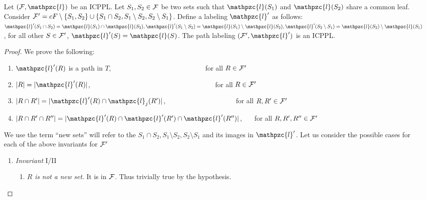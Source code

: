 \documentclass[envcountsect, envcountsame, 11pt]{../lib/llncs2e/llncs}
\def\cF{{\cal F}}
\def\cl{\mathpzc{l}}
\def\topshrink{0mm} %
\begin{document}
\noindent 
\begin{lemma}
  \label{lem:invar1}
Let $(\cF, \cl)$ be an ICPPL.  Let $S_1, S_2 \in \cF$ be two sets such that $\cl(S_1)$ and $\cl(S_2)$ share a common
leaf.  Consider $\cF' = cF \setminus \{S_1, S_2\} \cup \{S_1 \cap S_2, S_1 \setminus S_2, S_2 \setminus S_1 \}$. Define 
a labeling  $\cl'$ as follows:
$\cl'(S_1 \cap S_2) = \cl(S_1) \cap \cl(S_2), 
    \cl'(S_1 \setminus S_2) = \cl(S_1) \setminus \cl(S_2), 
    \cl'(S_2 \setminus S_1) = \cl(S_2) \setminus \cl(S_1)$, for all other $S \in \cF'$, $\cl'(S) = \cl(S)$. 
The path labeling $(\cF', \cl')$ is an ICPPL.
\end{lemma}
\begin{proof}
We prove the following:
  \begin{enumerate}[I {\ }] %
  \item $\cl'(R)$ is a path in $T$, \ \ \ \ \ \ \ \ \ \ \ \ \ \ \ \ \
    \ \ \ \ \ \ \ \ \ \ for all $R \in \cF'$%
  \item $|R| = |\cl'(R)|$, \ \ \ \ \ \ \ \ \ \ \ \ \ \ \ \ \ \ \ \ \
    \ \ \ \ \ \ \ \ \ \ \ \ \ \ \ for all $R \in
    \cF'$%
  \item $|R \cap R'| = |\cl'(R) \cap \cl_j(R')|$, \ \ \ \ \ \ \ \ \ \
    \ \ \ \ \ \ \ \ \ \ for all $R, R' \in \cF'$%
  \item $|R \cap R' \cap R''|=|\cl'(R) \cap \cl'(R') \cap
    \cl'(R'')|$, \ \ \ for all $R, R', R'' \in \cF'$
  \end{enumerate}
 We use the term ``new sets'' will refer to the   $S_1 \cap S_2, S_1 \setminus S_2, S_2 \setminus S_1$ and its
  images in $\cl'$.
Let us consider the possible cases for each of the above invariants for $\cF'$
 \begin{enumerate}[\textreferencemark]
  \item {\em Invariant} I/II
    \begin{enumerate}[{\bf a.}] %
    \item {\em $R$ is not a new set.} It is in $\cF$. Thus
      trivially true by the hypothesis.

\end{enumerate}
\end{enumerate}
\end{proof}
\end{document}
